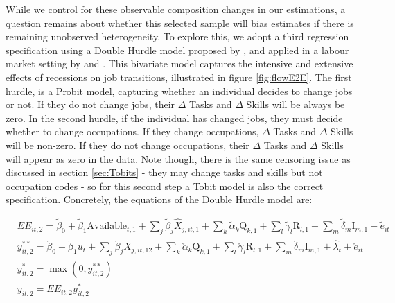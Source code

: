\documentclass[11pt, oneside]{article}
\begin{document}
While we control for these observable composition changes in our estimations, a question remains about whether this selected sample will bias estimates if there is remaining unobserved heterogeneity. To explore this, we adopt a third regression specification using a Double Hurdle model proposed by \cite{cragg1971}, and applied in a labour market setting by \cite{BlundellMeghir} and \cite{Blundell1989}. This bivariate model captures the intensive and extensive effects of recessions on job transitions, illustrated in figure \ref{fig:flowE2E}. The first hurdle, is a Probit model, capturing whether an individual decides to change jobs or not. If they do not change jobs, their $\Delta$ Tasks and $\Delta$ Skills will be always be zero. In the second hurdle, if the individual has changed jobs, they must decide whether to change occupations. If they change occupations, $\Delta$ Tasks and $\Delta$ Skills will be non-zero. If they do not change occupations, their $\Delta$ Tasks and $\Delta$ Skills will appear as zero in the data. Note though, there is the same censoring issue as discussed in section \ref{sec:Tobits} - they may change tasks and skills but not occupation codes -  so for this second step a Tobit model is also the correct specification. Concretely, the equations of the Double Hurdle model are:


\begin{subequations}
	\label{eqn:heckman}
	\begin{align}
	& EE_{it,2} = \tilde{\beta}_0 + \tilde{\beta}_{1}\text{Available}_{t,1} + \sum_{j} \tilde{\beta}_{j}\hat{X}_{j,it,1} + \sum_{k} \tilde{\alpha}_{k} \text{Q}_{k,1} + \sum_{l} \tilde{\gamma}_{l} \text{R}_{l,1} + \sum_{m} \tilde{\delta}_{m} \text{I}_{m,1}+  \tilde{e}_{it} \label{eqn:heckmanProbit}\\
	& y_{it,2}^{**} = \check{\beta}_0 + \check{\beta}_{1}u_{t} + \sum_{j} \check{\beta}_{j}X_{j,it,12} + \sum_{k}\check{\alpha}_{k} \text{Q}_{k,1} + \sum_{l} \check{\gamma}_{l} \text{R}_{l,1} + \sum_{m} \check{\delta}_{m} \text{I}_{m,1}+ \hat{\lambda}_t + \check{e}_{it} \label{eqn:heckmanTobit_start} \\
	& y_{it,2}^* =\max(0, y_{it,2}^{**})\\
	& y_{it,2} = EE_{it,2}y_{it,2}^* \label{eqn:heckmanTobit_end} 
	\end{align}
\end{subequations}
\end{document}
